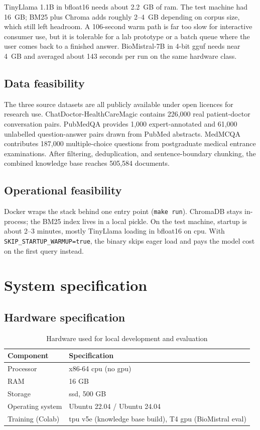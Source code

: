 TinyLlama 1.1B in bfloat16 needs about 2.2~GB of \ac{ram}. The test machine had 16~GB; BM25 plus Chroma adds roughly 2--4~GB depending on corpus size, which still left headroom. A 106-second warm path is far too slow for interactive consumer use, but it is tolerable for a lab prototype or a batch queue where the user comes back to a finished answer. BioMistral-7B in 4-bit \ac{gguf} needs near 4~GB and averaged about 143 seconds per run on the same hardware class.

\subsection{Data feasibility}

The three source datasets are all publicly available under open licences for research use. ChatDoctor-HealthCareMagic contains 226,000 real patient-doctor conversation pairs. PubMedQA provides 1,000 expert-annotated and 61,000 unlabelled question-answer pairs drawn from PubMed abstracts. MedMCQA contributes 187,000 multiple-choice questions from postgraduate medical entrance examinations. After filtering, deduplication, and sentence-boundary chunking, the combined knowledge base reaches 505,584 documents.

\subsection{Operational feasibility}

Docker wraps the stack behind one entry point (\texttt{make run}). ChromaDB stays in-process; the BM25 index lives in a local pickle. On the test machine, startup is about 2--3 minutes, mostly TinyLlama loading in bfloat16 on \ac{cpu}. With \texttt{SKIP\_STARTUP\_WARMUP=true}, the binary skips eager load and pays the model cost on the first query instead.

\section{System specification}

\subsection{Hardware specification}

\begin{table}[htbp]
\centering
\caption{Hardware used for local development and evaluation}
\renewcommand{\arraystretch}{1.3}
\begin{tabular}{|l|l|}
\hline
\textbf{Component} & \textbf{Specification} \\
\hline
Processor & x86-64 \ac{cpu} (no \ac{gpu}) \\
RAM & 16 GB \\
Storage & \ac{ssd}, 500 GB \\
Operating system & Ubuntu 22.04 / Ubuntu 24.04 \\
Training (Colab) & \ac{tpu} v5e (knowledge base build), T4 \ac{gpu} (BioMistral eval) \\
\hline
\end{tabular}
\end{table}

